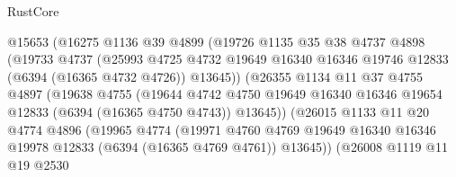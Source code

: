 \begin{lexlean}{RustCore}
\begin{coremodule}
                          @15653
                          (@16275
                            @1136
                            @39
                            @4899
                            (@19726
                              @1135
                              @35
                              @38
                              @4737
                              @4898
                              (@19733
                                @4737
                                (@25993
                                  @4725
                                  @4732
                                  @19649
                                  @16340
                                  @16346
                                  @19746
                                  @12833
                                  (@6394 (@16365 @4732 @4726))
                                  @13645))
                              (@26355
                                @1134
                                @11
                                @37
                                @4755
                                @4897
                                (@19638
                                  @4755
                                  (@19644
                                    @4742
                                    @4750
                                    @19649
                                    @16340
                                    @16346
                                    @19654
                                    @12833
                                    (@6394 (@16365 @4750 @4743))
                                    @13645))
                                (@26015
                                  @1133
                                  @11
                                  @20
                                  @4774
                                  @4896
                                  (@19965
                                    @4774
                                    (@19971
                                      @4760
                                      @4769
                                      @19649
                                      @16340
                                      @16346
                                      @19978
                                      @12833
                                      (@6394 (@16365 @4769 @4761))
                                      @13645))
                                  (@26008
                                    @1119
                                    @11
                                    @19
                                    @2530

\end{coremodule}
\end{lexlean}
